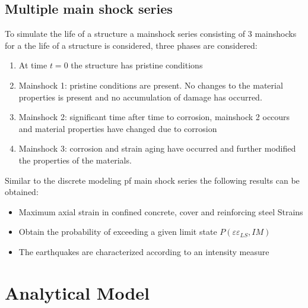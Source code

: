 \subsection{Multiple main shock series}

To simulate the life of a structure a mainshock series consisting of 3 mainshocks for a the life of a structure is considered, three phases are considered:
\begin{enumerate}

	\item At time $t=0$ the structure has pristine conditions
	\item Mainshock 1: pristine conditions are present. No changes to the material properties is present and no accumulation of damage has occurred.
	\item Mainshock 2: significant time after time to corrosion, mainshock 2 occours and  material properties have changed due to corrosion
	\item Mainshock 3: corrosion and strain aging have occurred and further modified the properties of the materials.
\end{enumerate}

%

Similar to the discrete modeling pf main shock series the following results can be obtained:

\begin{itemize}
	\item Maximum axial strain in confined concrete, cover and reinforcing steel 
Strains
	\item Obtain the probability of exceeding a given limit state $P(\varepsilon\varepsilon_{LS},IM)$
	\item The earthquakes are characterized according to an intensity measure

\end{itemize}

\section{Analytical Model}


